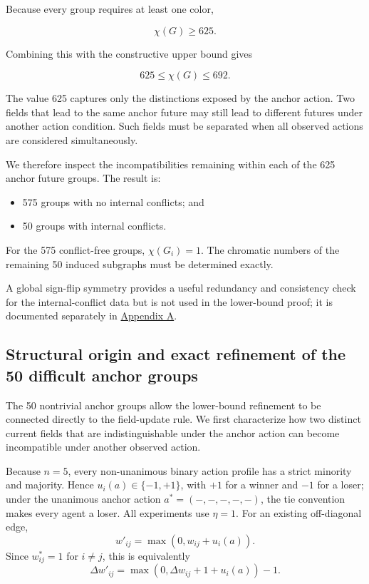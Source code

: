 \documentclass[
  11pt,
]{article}
\providecommand{\tightlist}{%
  \setlength{\itemsep}{0pt}\setlength{\parskip}{0pt}}
\begin{document}
Because every group requires at least one color,

\[{\chi(G)\ge625.}\]

Combining this with the constructive upper bound gives

\[{\boxed{625\le\chi(G)\le692}.}\]

The value 625 captures only the distinctions exposed by the anchor
action. Two fields that lead to the same anchor future may still lead to
different futures under another action condition. Such fields must be
separated when all observed actions are considered simultaneously.

We therefore inspect the incompatibilities remaining within each of the
625 anchor future groups. The result is:

\begin{itemize}
\tightlist
\item
  575 groups with no internal conflicts; and
\item
  50 groups with internal conflicts.
\end{itemize}

For the 575 conflict-free groups, \({\chi(G_i)=1}\). The chromatic
numbers of the remaining 50 induced subgraphs must be determined
exactly.

A global sign-flip symmetry provides a useful redundancy and consistency
check for the internal-conflict data but is not used in the lower-bound
proof; it is documented separately in \hyperref[appendix-sign-flip]{Appendix A}.

\subsection{Structural origin and exact refinement of the 50 difficult anchor groups}\label{structural-origin-and-exact-refinement}

The 50 nontrivial anchor groups allow the lower-bound refinement to be
connected directly to the field-update rule.  We first characterize how
two distinct current fields that are indistinguishable under the anchor
action can become incompatible under another observed action.

Because \(n=5\), every non-unanimous binary action profile has a strict
minority and majority.  Hence \(u_i(a)\in\{-1,+1\}\), with \(+1\) for a
winner and \(-1\) for a loser; under the unanimous anchor action
\(a^\ast=(-,-,-,-,-)\), the tie convention makes every agent a loser.
All experiments use \(\eta=1\).  For an existing off-diagonal edge,
\[
 w'_{ij}=\max(0,w_{ij}+u_i(a)).
\]
Since \(w^\ast_{ij}=1\) for \(i\neq j\), this is equivalently
\[
 \Delta w'_{ij}=\max(0,\Delta w_{ij}+1+u_i(a))-1.
 \tag{18}\label{eq:delta-field-update-structural}
\]
\end{document}
